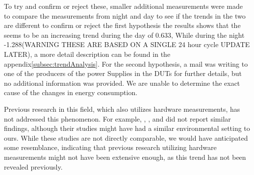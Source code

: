 To try and confirm or reject these, smaller additional measurements were made to compare the measurements from night and day to see if the trends in the two are different to confirm or reject the first hypothesis the results shows that the seems to be an increasing trend during the day of 0.633, While during the night -1.288(WARNING THESE ARE BASED ON A SINGLE 24 hour cycle UPDATE LATER), a more detail description can be found in the appendix\cref{subsec:trendAnalysis}. For the second hypothesis, a mail was writing to one of the producers of the power Supplies in the DUTs for further details, but no additional information was provided.
We are unable to determine the exact cause of the changes in energy consumption.

Previous research in this field, which also utilizes hardware measurements, has not addressed this phenomenon. For example, \cite{georgiou2020energy}, \cite{Koedijk2022diff}, and \cite{khan2018rapl} did not report similar findings, although their studies might have had a similar environmental setting to ours. While these studies are not directly comparable, we would have anticipated some resemblance, indicating that previous research utilizing hardware measurements might not have been extensive enough, as this trend has not been revealed previously.

